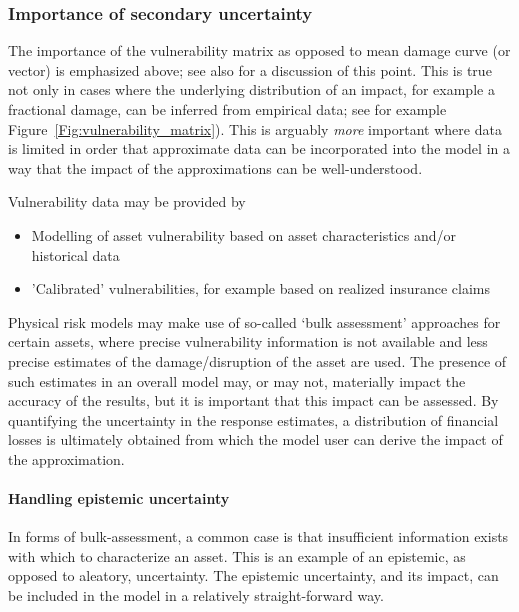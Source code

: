 \documentclass[a4paper,11pt]{extarticle} %
\begin{document}
\subsubsection{Importance of secondary uncertainty}
The importance of the vulnerability matrix as opposed to mean damage curve (or vector) is emphasized above; see also \cite{Taylor:2015} for a discussion of this point. This is true not only in cases where the underlying distribution of an impact, for example a fractional damage, can be inferred from empirical data; see for example Figure~\ref{Fig:vulnerability_matrix}). This is arguably \emph{more} important where data is limited in order that approximate data can be incorporated into the model in a way that the impact of the approximations can be well-understood.

Vulnerability data may be provided by
\begin{itemize}
    \item Modelling of asset vulnerability based on asset characteristics and/or historical data
    \item 'Calibrated' vulnerabilities, for example based on realized insurance claims
\end{itemize}
Physical risk models may make use of so-called `bulk assessment' approaches for certain assets, where precise vulnerability information is not available and less precise estimates of the damage/disruption of the asset are used. The presence of such estimates in an overall model may, or may not, materially impact the accuracy of the results, but it is important that this impact can be assessed. By quantifying the uncertainty in the response estimates, a distribution of financial losses is ultimately obtained from which the model user can derive the impact of the approximation.

\paragraph{Handling epistemic uncertainty}
In forms of bulk-assessment, a common case is that insufficient information exists with which to characterize an asset. This is an example of an epistemic, as opposed to aleatory, uncertainty. The epistemic uncertainty, and its impact, can be included in the model in a relatively straight-forward way.
\end{document}
